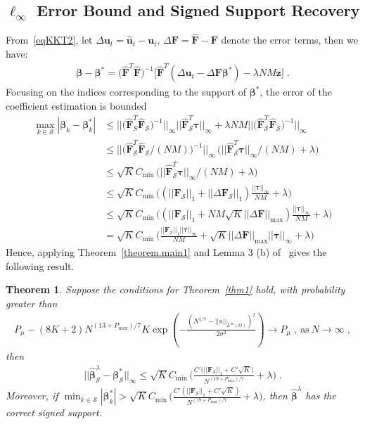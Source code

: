 \documentclass[a4paper,11pt]{article}
\newcommand{\btau}{\bm{\tau}}
\newcommand{\bbeta}{\bm{\beta}}
\newcommand{\bF}{\mathbf{F}}
\newcommand{\mS}{\mathcal{S}}
\newcommand{\bu}{\mathbf{u}}
\newtheorem{thm}{Theorem}[section]
\begin{document}
\subsection{$\ell_\infty$ Error Bound and Signed Support Recovery}
From~\eqref{eqKKT2}, let $\Delta \bu_t=\widehat{\bu}_t-\bu_t$, $\Delta \bF=\widehat{\bF}-\bF$ denote the error terms, then we  have:
\begin{align*}
\bbeta-\bbeta^*=\Big(\widehat{\bF}^T\widehat{\bF}\Big)^{-1}	\Big[\widehat{\bF}^T(\Delta \bu_t-\Delta \bF\bbeta^*)-\lambda NM \mathbf{z}\Big]\;.
\end{align*}
Focusing on the indices corresponding to the support of $\bbeta^*$, the error of the coefficient estimation is bounded
\begin{align*}
\max_{k\in \mS}|\bbeta_k-\bbeta^*_k|&\leq	||\Big(\widehat{\bF}_S^T\widehat{\bF}_\mS\Big)^{-1}||_\infty||\widehat{\bF}_\mS^T\btau||_\infty+\lambda NM||\Big(\widehat{\bF}_\mS^T\widehat{\bF}_\mS\Big)^{-1}||_\infty\\
&\leq ||\Big(\widehat{\bF}_\mS^T\widehat{\bF}_\mS/(NM)\Big)^{-1}||_\infty\,\big(||\widehat{\bF}_\mS^T\btau||_\infty/(NM)+\lambda\big)\\
&\leq \sqrt{K}C_{\min}\,\big(||\widehat{\bF}_\mS^T\btau||_\infty/(NM)+\lambda\big)\\
&\leq \sqrt{K}C_{\min}\,\Big((||\bF_\mS||_1+||\Delta \bF_\mS||_1)\frac{||\btau||_\infty}{NM}+\lambda\Big)\\
&\leq \sqrt{K}C_{\min}\,\Big((||\bF_\mS||_1+NM\sqrt{K}||\Delta \bF||_{\max})\frac{||\btau||_\infty}{NM}+\lambda\Big)\\
&=\sqrt{K}C_{\min}\,\Big(\frac{||\bF_\mS||_1||\btau||_\infty}{NM}+\sqrt{K}||\Delta \bF||_{\max}||\btau||_\infty+\lambda\Big)
\end{align*}
Hence, applying Theorem~\ref{theorem.main1} and Lemma 3 (b) of~\cite{wainwright2009sharp} gives the following result.
\begin{thm}\label{inftythm}
Suppose the conditions for Theorem~\ref{thm1} hold,  with probability greater than
\begin{align}
	P_\mu-(8K+2)N^{(13+P_{\max})/7}K\exp(-\frac{(N^{1/7}-||u||_{L^\infty(\Omega)})^2}{2\sigma^2})\longrightarrow P_\mu\;,~\text{as}~N\to\infty\;,
\end{align}
then
\begin{align}
||\widehat{\bbeta}_\mS^\lambda-\bbeta_\mS^*||_\infty\leq \sqrt{K}C_{\min}\,\Big(\frac{C'\big(||\bF_\mS||_1+C'\sqrt{K}\big)}{N^{(19+P_{\max})/7}}+\lambda\Big)\;.\label{infbound}
\end{align}
Moreover, if $\min_{k\in \mS}|\bbeta_k^*|>\sqrt{K}C_{\min}\,\Big(\frac{C'(||\bF_\mS||_1+C'\sqrt{K})}{N^{(19+P_{\max})/7}}+\lambda\Big)$, then $\widehat{\bbeta}^\lambda$ has the correct signed support.
\end{thm}
\end{document}
